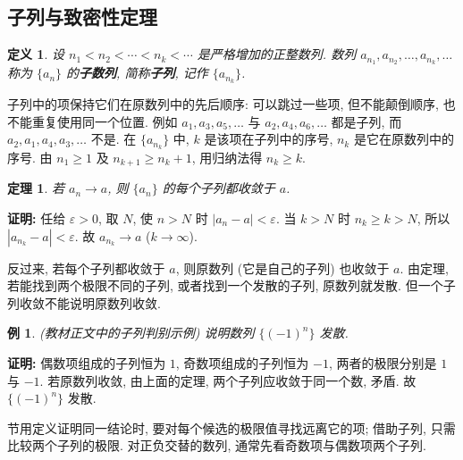 \documentclass[UTF8,openany]{ctexbook}
\theoremstyle{chinesetextbook}
\newtheorem{definition}{定义}[section]
\newtheorem{example}{例}[section]
\newtheorem{theorem}{定理}[section]
\newenvironment{cnproof}{\par\indent\textbf{证明:} \ignorespaces}{\par}
\begin{document}
\subsection{子列与致密性定理}
\begin{definition}
设 $n_1<n_2<\cdots<n_k<\cdots$ 是严格增加的正整数列. 数列 $a_{n_1},a_{n_2},\ldots,a_{n_k},\ldots$ 称为 $\{a_n\}$ 的\textbf{子数列}, 简称\textbf{子列}, 记作 $\{a_{n_k}\}$.
\end{definition}
子列中的项保持它们在原数列中的先后顺序: 可以跳过一些项, 但不能颠倒顺序, 也不能重复使用同一个位置. 例如 $a_1,a_3,a_5,\ldots$ 与 $a_2,a_4,a_6,\ldots$ 都是子列, 而 $a_2,a_1,a_4,a_3,\ldots$ 不是. 在 $\{a_{n_k}\}$ 中, $k$ 是该项在子列中的序号, $n_k$ 是它在原数列中的序号. 由 $n_1\ge1$ 及 $n_{k+1}\ge n_k+1$, 用归纳法得 $n_k\ge k$.
\begin{theorem}
若 $a_n\to a$, 则 $\{a_n\}$ 的每个子列都收敛于 $a$.
\end{theorem}
\begin{cnproof}
任给 $\varepsilon>0$, 取 $N$, 使 $n>N$ 时 $|a_n-a|<\varepsilon$. 当 $k>N$ 时 $n_k\ge k>N$, 所以 $|a_{n_k}-a|<\varepsilon$. 故 $a_{n_k}\to a$ ($k\to\infty$).
\end{cnproof}
反过来, 若每个子列都收敛于 $a$, 则原数列 (它是自己的子列) 也收敛于 $a$. 由定理, 若能找到两个极限不同的子列, 或者找到一个发散的子列, 原数列就发散. 但一个子列收敛不能说明原数列收敛.
\begin{example}
\textnormal{(教材正文中的子列判别示例)} 说明数列 $\{(-1)^n\}$ 发散.
\end{example}
\begin{cnproof}
偶数项组成的子列恒为 $1$, 奇数项组成的子列恒为 $-1$, 两者的极限分别是 $1$ 与 $-1$. 若原数列收敛, 由上面的定理, 两个子列应收敛于同一个数, 矛盾. 故 $\{(-1)^n\}$ 发散.
\end{cnproof}
1.2 节用定义证明同一结论时, 要对每个候选的极限值寻找远离它的项; 借助子列, 只需比较两个子列的极限. 对正负交替的数列, 通常先看奇数项与偶数项两个子列.
\end{document}
